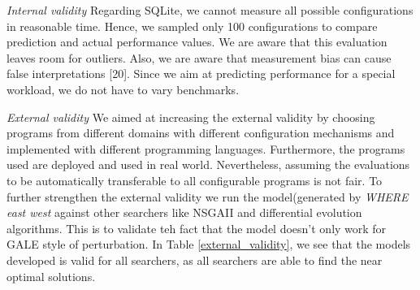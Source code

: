 \documentclass{sig-alternative}
\begin{document}
{\em Internal validity}
Regarding SQLite, we cannot measure all possible configurations in reasonable time. Hence, we sampled only 100 configurations to compare prediction and actual performance values. We are aware that this evaluation leaves room for outliers.
Also, we are aware that measurement bias can cause false interpretations [20]. Since we aim at predicting performance for a special workload, we do not have to vary benchmarks.



{\em External validity}  We aimed at increasing the external validity by choosing programs from different domains with different configuration mechanisms and implemented with different programming languages. Furthermore, the programs used are deployed and used in real world. Nevertheless, assuming the evaluations to be automatically transferable  to all configurable programs is not fair. To further strengthen the external validity we run the model(generated by \textit{WHERE east west} against other searchers like NSGAII and differential evolution algorithms\cite{storn1997differential}. This is to validate teh fact that the model doesn't only work for GALE style of perturbation. In Table \ref{external_validity}, we see that the models developed is valid for all searchers, as all searchers are able to find the near optimal solutions.
\end{document}
